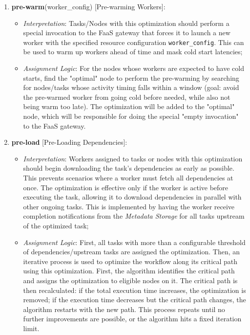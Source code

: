 \documentclass[conference]{IEEEtran}
\begin{document}
\begin{enumerate}
\item\textbf{pre-warm}(worker\_config) [Pre-warming Workers]:
\begin{itemize}
  \item \textit{Interpretation}: Tasks/Nodes with this optimization should perform a special invocation to the FaaS gateway that forces it to launch a new worker with the specified resource configuration \texttt{worker\_config}. This can be used to warm up workers ahead of time and mask cold start latencies;
  \item \textit{Assignment Logic}: For the nodes whose workers are expected to have cold starts, find the "optimal" node to perform the pre-warming by searching for nodes/tasks whose activity timing falls within a window (goal: avoid the pre-warmed worker from going cold before needed, while also not being warm too late). The optimization will be added to the "optimal" node, which will be responsible for doing the special "empty invocation" to the FaaS gateway.
\end{itemize}

\item\textbf{pre-load} [Pre-Loading Dependencies]:
\begin{itemize}
  \item \textit{Interpretation}: Workers assigned to tasks or nodes with this optimization should begin downloading the task's dependencies as early as possible. This prevents scenarios where a worker must fetch all dependencies at once. The optimization is effective only if the worker is active before executing the task, allowing it to download dependencies in parallel with other ongoing tasks. This is implemented by having the worker receive completion notifications from the \textit{Metadata Storage} for all tasks upstream of the optimized task;
  \item \textit{Assignment Logic}: First, all tasks with more than a configurable threshold of dependencies/upstream tasks are assigned the optimization. Then, an iterative process is used to optimize the workflow along its critical path using this optimization. First, the algorithm identifies the critical path and assigns the optimization to eligible nodes on it. The critical path is then recalculated: if the total execution time increases, the optimization is removed; if the execution time decreases but the critical path changes, the algorithm restarts with the new path. This process repeats until no further improvements are possible, or the algorithm hits a fixed iteration limit.
\end{itemize}


\end{enumerate}
\end{document}
